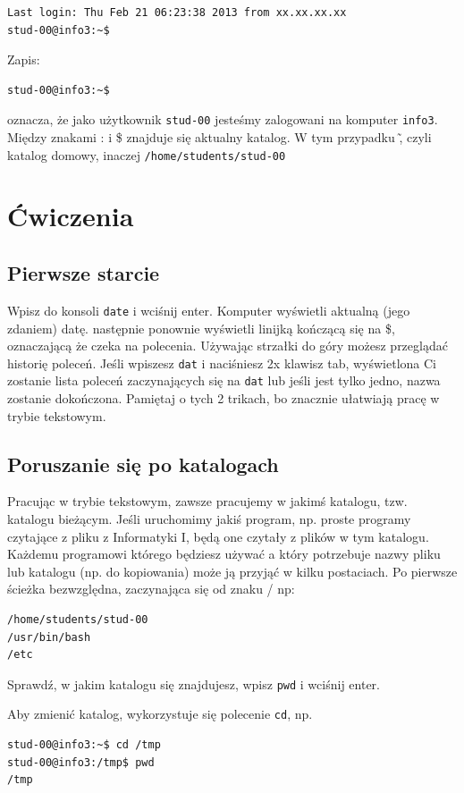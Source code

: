\documentclass[landscape]{article}
\begin{document}
\begin{verbatim}
Last login: Thu Feb 21 06:23:38 2013 from xx.xx.xx.xx
stud-00@info3:~$
\end{verbatim}

Zapis:
\begin{verbatim}
stud-00@info3:~$
\end{verbatim}
oznacza, że jako użytkownik {\tt stud-00} jesteśmy zalogowani na komputer {\tt info3}. Między znakami : i  \$ znajduje się aktualny katalog. W tym przypadku \~, czyli katalog domowy, inaczej {\tt /home/students/stud-00 }

\section{Ćwiczenia}
\subsection{Pierwsze starcie}

Wpisz do konsoli {\tt date} i wciśnij enter. Komputer wyświetli aktualną (jego zdaniem) datę. następnie ponownie wyświetli linijką kończącą się na \$, oznaczającą że czeka na polecenia. Używając strzałki do góry możesz przeglądać historię poleceń. Jeśli wpiszesz {\tt dat} i naciśniesz 2x klawisz tab, wyświetlona Ci zostanie lista poleceń zaczynających się na {\tt dat} lub jeśli jest tylko jedno, nazwa zostanie dokończona. Pamiętaj o tych 2 trikach, bo znacznie ułatwiają pracę w trybie tekstowym.

\subsection{Poruszanie się po katalogach}

Pracując w trybie tekstowym, zawsze pracujemy w jakimś katalogu, tzw. katalogu bieżącym. Jeśli uruchomimy jakiś program, np. proste programy czytające z pliku z Informatyki I, będą one czytały z plików w tym katalogu. Każdemu programowi którego będziesz używać a który potrzebuje nazwy pliku lub katalogu (np. do kopiowania) może ją przyjąć w kilku postaciach. Po pierwsze ścieżka  bezwzględna, zaczynająca się od znaku / np:
\begin{verbatim}
/home/students/stud-00
/usr/bin/bash
/etc
\end{verbatim}

Sprawdź, w jakim katalogu się znajdujesz, wpisz {\tt pwd} i wciśnij enter.

Aby zmienić katalog, wykorzystuje się polecenie {\tt cd}, np.
\begin{verbatim}
stud-00@info3:~$ cd /tmp
stud-00@info3:/tmp$ pwd
/tmp
\end{verbatim}
\end{document}
